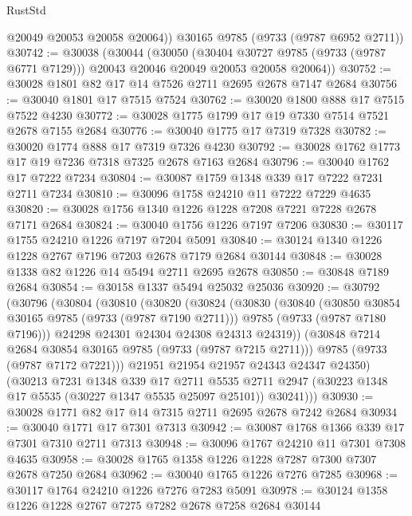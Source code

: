 \begin{lexlean}{RustStd}
\begin{coremodule}
{\begin{coremodule}
{{{{{{{{{{{{{{{{{{{{{{{{{{{{{{{{{{{{{{{{{{{{{{{{{{{{{{{        @20049
        @20053
        @20058
        @20064))
    @30165
    @9785
    (@9733 (@9787 @6952 @2711))
@30742 := @30038
    (@30044
      (@30050
        (@30404 @30727 @9785 (@9733 (@9787 @6771 @7129)))
        @20043
        @20046
        @20049
        @20053
        @20058
        @20064))
@30752 := @30028 @1801 @82 @17 @14 @7526 @2711 @2695 @2678 @7147 @2684
@30756 := @30040 @1801 @17 @7515 @7524
@30762 := @30020 @1800 @888 @17 @7515 @7522 @4230
@30772 := @30028 @1775 @1799 @17 @19 @7330 @7514 @7521 @2678 @7155 @2684
@30776 := @30040 @1775 @17 @7319 @7328
@30782 := @30020 @1774 @888 @17 @7319 @7326 @4230
@30792 := @30028 @1762 @1773 @17 @19 @7236 @7318 @7325 @2678 @7163 @2684
@30796 := @30040 @1762 @17 @7222 @7234
@30804 := @30087 @1759 @1348 @339 @17 @7222 @7231 @2711 @7234
@30810 := @30096 @1758 @24210 @11 @7222 @7229 @4635
@30820 := @30028 @1756 @1340 @1226 @1228 @7208 @7221 @7228 @2678 @7171 @2684
@30824 := @30040 @1756 @1226 @7197 @7206
@30830 := @30117 @1755 @24210 @1226 @7197 @7204 @5091
@30840 := @30124 @1340 @1226 @1228 @2767 @7196 @7203 @2678 @7179 @2684 @30144
@30848 := @30028 @1338 @82 @1226 @14 @5494 @2711 @2695 @2678
@30850 := @30848 @7189 @2684
@30854 := @30158 @1337 @5494 @25032 @25036
@30920 := @30792
    (@30796
      (@30804
        (@30810
          (@30820
            (@30824
              (@30830
                (@30840
                  (@30850 @30854 @30165 @9785 (@9733 (@9787 @7190 @2711)))
                  @9785
                  (@9733 (@9787 @7180 @7196)))
                @24298
                @24301
                @24304
                @24308
                @24313
                @24319))
            (@30848 @7214 @2684 @30854 @30165 @9785 (@9733 (@9787 @7215 @2711)))
            @9785
            (@9733 (@9787 @7172 @7221)))
          @21951
          @21954
          @21957
          @24343
          @24347
          @24350)
        (@30213
          @7231
          @1348
          @339
          @17
          @2711
          @5535
          @2711
          @2947
          (@30223 @1348 @17 @5535 (@30227 @1347 @5535 @25097 @25101))
          @30241)))
@30930 := @30028 @1771 @82 @17 @14 @7315 @2711 @2695 @2678 @7242 @2684
@30934 := @30040 @1771 @17 @7301 @7313
@30942 := @30087 @1768 @1366 @339 @17 @7301 @7310 @2711 @7313
@30948 := @30096 @1767 @24210 @11 @7301 @7308 @4635
@30958 := @30028 @1765 @1358 @1226 @1228 @7287 @7300 @7307 @2678 @7250 @2684
@30962 := @30040 @1765 @1226 @7276 @7285
@30968 := @30117 @1764 @24210 @1226 @7276 @7283 @5091
@30978 := @30124 @1358 @1226 @1228 @2767 @7275 @7282 @2678 @7258 @2684 @30144
}}}}}}}}}}}}}}}}}}}}}}}}}}}}}}}}}}}}}}}}}}}}}}}}}}}}}}}
\end{coremodule}}
\end{coremodule}
\end{lexlean}
